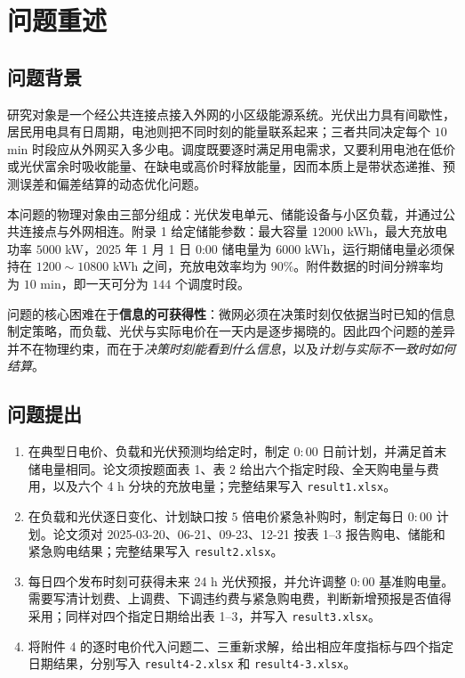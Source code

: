 \section{问题重述}

\subsection{问题背景}

研究对象是一个经公共连接点接入外网的小区级能源系统。光伏出力具有间歇性，居民用电具有日周期，电池则把不同时刻的能量联系起来；三者共同决定每个 $10$ min 时段应从外网买入多少电。调度既要逐时满足用电需求，又要利用电池在低价或光伏富余时吸收能量、在缺电或高价时释放能量，因而本质上是带状态递推、预测误差和偏差结算的动态优化问题。

本问题的物理对象由三部分组成：光伏发电单元、储能设备与小区负载，并通过公共连接点与外网相连。附录 1 给定储能参数：最大容量 $12000$ kWh，最大充放电功率 $5000$ kW，2025 年 1 月 1 日 0:00 储电量为 $6000$ kWh，运行期储电量必须保持在 $1200\sim10800$ kWh 之间，充放电效率均为 $90\%$。附件数据的时间分辨率均为 $10$ min，即一天可分为 $144$ 个调度时段。

问题的核心困难在于\textbf{信息的可获得性}：微网必须在决策时刻仅依据当时已知的信息制定策略，而负载、光伏与实际电价在一天内是逐步揭晓的。因此四个问题的差异并不在物理约束，而在于\emph{决策时刻能看到什么信息}，以及\emph{计划与实际不一致时如何结算}。

\subsection{问题提出}

\begin{enumerate}[label=\textbf{问题 \arabic*.},leftmargin=5.5em,itemsep=3pt,topsep=2pt]
	\item 在典型日电价、负载和光伏预测均给定时，制定 $0{:}00$ 日前计划，并满足首末储电量相同。论文须按题面表 1、表 2 给出六个指定时段、全天购电量与费用，以及六个 4 h 分块的充放电量；完整结果写入 \texttt{result1.xlsx}。
	\item 在负载和光伏逐日变化、计划缺口按 $5$ 倍电价紧急补购时，制定每日 $0{:}00$ 计划。论文须对 2025-03-20、06-21、09-23、12-21 按表 1--3 报告购电、储能和紧急购电结果；完整结果写入 \texttt{result2.xlsx}。
	\item 每日四个发布时刻可获得未来 24 h 光伏预报，并允许调整 $0{:}00$ 基准购电量。需要写清计划费、上调费、下调违约费与紧急购电费，判断新增预报是否值得采用；同样对四个指定日期给出表 1--3，并写入 \texttt{result3.xlsx}。
	\item 将附件 4 的逐时电价代入问题二、三重新求解，给出相应年度指标与四个指定日期结果，分别写入 \texttt{result4-2.xlsx} 和 \texttt{result4-3.xlsx}。
\end{enumerate}

